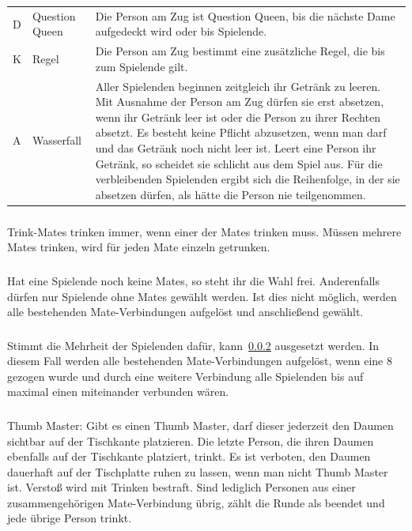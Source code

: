 \begin{tabular}{p{1em} p{4em} p{23em}}
	D  & Question Queen & Die Person am Zug ist Question Queen, bis die nächste Dame aufgedeckt wird oder bis Spielende.                                                       \\[1ex]
	K  & Regel          & Die Person am Zug bestimmt eine zusätzliche Regel, die bis zum Spielende gilt.                                                                       \\[1ex]
	A  & Wasserfall     & Aller Spielenden beginnen zeitgleich ihr Getränk zu leeren.
	Mit Ausnahme der Person am Zug dürfen sie erst absetzen, wenn ihr Getränk leer ist oder die Person zu ihrer Rechten absetzt.
	Es besteht keine Pflicht abzusetzen, wenn man darf und das Getränk noch nicht leer ist.
	Leert eine Person ihr Getränk, so scheidet sie schlicht aus dem Spiel aus.
	Für die verbleibenden Spielenden ergibt sich die Reihenfolge, in der sie absetzen dürfen, als hätte die Person nie teilgenommen.                                           \\[1ex]
\end{tabular}

\subsubsection{}
Trink-Mates trinken immer, wenn einer der Mates trinken muss.
Müssen mehrere Mates trinken, wird für jeden Mate einzeln getrunken.

\subsubsection{}\label{Ring_of_Fire:Mates}
Hat eine Spielende noch keine Mates, so steht ihr die Wahl frei.
Anderenfalls dürfen nur Spielende ohne Mates gewählt werden.
Ist dies nicht möglich, werden alle bestehenden Mate-Verbindungen aufgelöst und anschließend gewählt.

\subsubsection{}
Stimmt die Mehrheit der Spielenden dafür, kann~\ref{Ring_of_Fire:Mates} ausgesetzt werden.
In diesem Fall werden alle bestehenden Mate-Verbindungen aufgelöst, wenn eine 8 gezogen wurde und durch eine weitere Verbindung alle Spielenden bis auf maximal einen miteinander verbunden wären.

\subsubsection{}
Thumb Master: Gibt es einen Thumb Master, darf dieser jederzeit den Daumen sichtbar auf der Tischkante platzieren.
Die letzte Person, die ihren Daumen ebenfalls auf der Tischkante platziert, trinkt.
Es ist verboten, den Daumen dauerhaft auf der Tischplatte ruhen zu lassen, wenn man nicht Thumb Master ist.
Verstoß wird mit Trinken bestraft.
Sind lediglich Personen aus einer zusammengehörigen Mate-Verbindung übrig, zählt die Runde als beendet und jede übrige Person trinkt.

